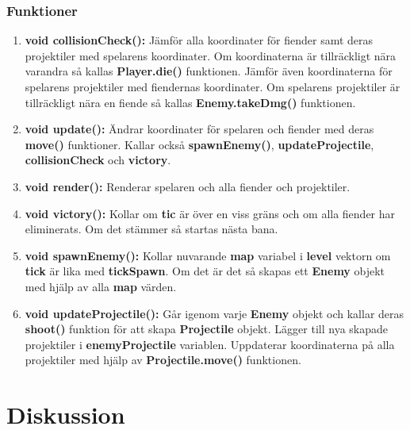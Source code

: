 \documentclass{TDP005mall}
\begin{document}
 \subsubsection*{Funktioner}
 \begin{enumerate}
   \item \textbf{void collisionCheck(): } Jämför alla koordinater för fiender samt deras projektiler med spelarens koordinater.
                                          Om koordinaterna är tillräckligt nära varandra så kallas \textbf{Player.die()} funktionen.
                                          Jämför även koordinaterna för spelarens projektiler med fiendernas koordinater. Om spelarens projektiler är tillräckligt nära en fiende så kallas \textbf{Enemy.takeDmg()} funktionen.
  \item \textbf{void update(): } Ändrar koordinater för spelaren och fiender med deras \textbf{move()} funktioner.
                                Kallar också \textbf{spawnEnemy()}, \textbf{updateProjectile}, \textbf{collisionCheck} och \textbf{victory}.
  \item \textbf{void render(): } Renderar spelaren och alla fiender och projektiler.
  \item \textbf{void victory(): } Kollar om \textbf{tic} är över en viss gräns och om alla fiender har eliminerats. Om det stämmer så startas nästa bana.
  \item \textbf{void spawnEnemy(): } Kollar nuvarande \textbf{map} variabel i \textbf{level} vektorn om \textbf{tick} är lika med \textbf{tickSpawn}.
                                      Om det är det så skapas ett \textbf{Enemy} objekt med hjälp av alla \textbf{map} värden.

  \item \textbf{void updateProjectile(): } Går igenom varje \textbf{Enemy} objekt och kallar deras \textbf{shoot()} funktion för att skapa \textbf{Projectile} objekt.
                                           Lägger till nya skapade projektiler i \textbf{enemyProjectile} variablen.
                                           Uppdaterar koordinaterna på alla projektiler med hjälp av \textbf{Projectile.move()} funktionen.

  \end{enumerate}
  
\vspace{3cm}  
  
\section{Diskussion}
\end{document}
